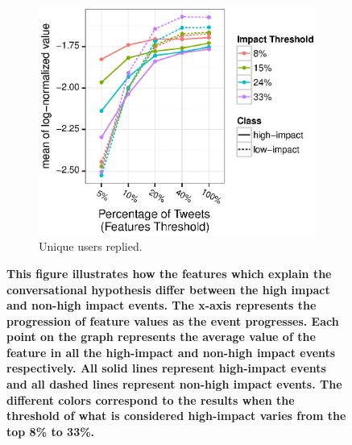 \documentclass[10pt,letterpaper]{article}
\begin{document}
\begin{figure}
  \begin{subfigure}[b]{0.45\textwidth}
    \includegraphics[width=\textwidth]{figures_SI/Plots_from_data/total_unique_users_replied.eps}
    \caption{Unique users
      replied.} \label{fig:feat_uniq_users_replied}
  \end{subfigure}
  \caption{\textbf{This figure illustrates how the features which
      explain the conversational hypothesis differ between the high
      impact and non-high impact events. The x-axis represents the
      progression of feature values as the event progresses. Each
      point on the graph represents the average value of the feature
      in all the high-impact and non-high impact events respectively.
      All solid lines represent high-impact events and all dashed
      lines represent non-high impact events. The different colors
      correspond to the results when the threshold of what is
      considered high-impact varies from the top 8\% to 33\%. }}
  \label{fig:conversational_hypothesis}
\end{figure}

\end{document}
